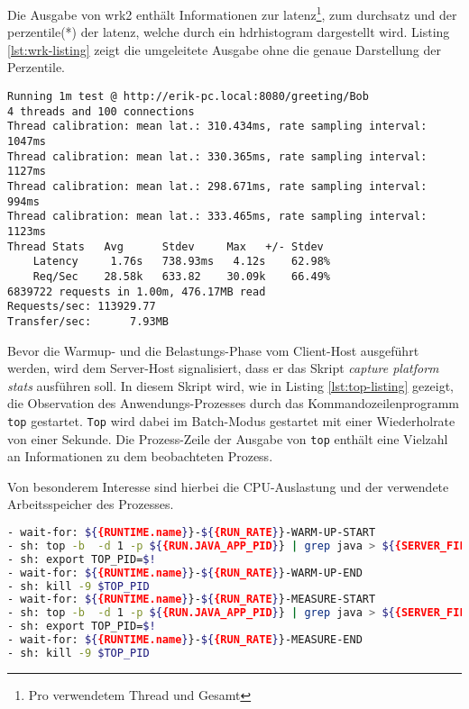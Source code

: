 Die Ausgabe von wrk2 enthält Informationen zur \Gls{latenz}\footnote{Pro verwendetem Thread und Gesamt},
zum \Gls{durchsatz} und der \Gls{perzentile}(*) der \Gls{latenz}, welche durch ein \acrshort{hdrhistogram} dargestellt wird.
Listing \ref*{lst:wrk-listing} zeigt die umgeleitete Ausgabe ohne die genaue Darstellung der Perzentile.

\begin{lstlisting}[caption=Beispiel für Ausgabe von wrk,captionpos=b, label=lst:wrk-listing]
Running 1m test @ http://erik-pc.local:8080/greeting/Bob
4 threads and 100 connections
Thread calibration: mean lat.: 310.434ms, rate sampling interval: 1047ms
Thread calibration: mean lat.: 330.365ms, rate sampling interval: 1127ms
Thread calibration: mean lat.: 298.671ms, rate sampling interval: 994ms
Thread calibration: mean lat.: 333.465ms, rate sampling interval: 1123ms
Thread Stats   Avg      Stdev     Max   +/- Stdev
	Latency     1.76s   738.93ms   4.12s    62.98%
	Req/Sec    28.58k   633.82    30.09k    66.49%
6839722 requests in 1.00m, 476.17MB read
Requests/sec: 113929.77
Transfer/sec:      7.93MB
\end{lstlisting}

Bevor die Warmup- und die Belastungs-Phase vom Client-Host ausgeführt werden, wird dem Server-Host signalisiert, dass
er das Skript \textit{capture platform stats} ausführen soll.
In diesem Skript wird, wie in Listing \ref{lst:top-listing} gezeigt, die Observation des Anwendungs-Prozesses durch das Kommandozeilenprogramm \verb|top| gestartet.
\verb|Top| wird dabei im Batch-Modus gestartet mit einer Wiederholrate von einer Sekunde.
Die Prozess-Zeile der Ausgabe von \verb|top| enthält eine Vielzahl an Informationen zu dem beobachteten Prozess.\parencite{linuxTopManual}

Von besonderem Interesse sind hierbei die CPU-Auslastung und der verwendete Arbeitsspeicher des Prozesses.

\begin{lstlisting}[language=sh, caption=Auszug des qDup Skripts capture-platform-stats, captionpos=b, label=lst:top-listing]
- wait-for: ${{RUNTIME.name}}-${{RUN_RATE}}-WARM-UP-START
- sh: top -b  -d 1 -p ${{RUN.JAVA_APP_PID}} | grep java > ${{SERVER_FILE_PATH}}/output/${{RUNTIME.name}}-${{RUN_RATE}}-WARM-UP-top.out &
- sh: export TOP_PID=$!
- wait-for: ${{RUNTIME.name}}-${{RUN_RATE}}-WARM-UP-END
- sh: kill -9 $TOP_PID
- wait-for: ${{RUNTIME.name}}-${{RUN_RATE}}-MEASURE-START
- sh: top -b  -d 1 -p ${{RUN.JAVA_APP_PID}} | grep java > ${{SERVER_FILE_PATH}}/output/${{RUNTIME.name}}-${{RUN_RATE}}-MEASURE-top.out &
- sh: export TOP_PID=$!
- wait-for: ${{RUNTIME.name}}-${{RUN_RATE}}-MEASURE-END
- sh: kill -9 $TOP_PID
\end{lstlisting}

